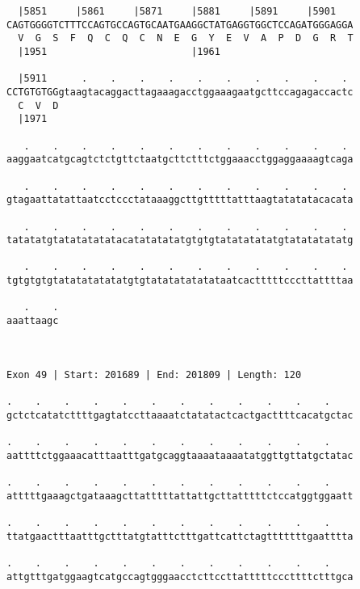 \documentclass{article}
\begin{document}
\begin{Verbatim}
  |5851     |5861     |5871     |5881     |5891     |5901   
CAGTGGGGTCTTTCCAGTGCCAGTGCAATGAAGGCTATGAGGTGGCTCCAGATGGGAGGA
  V  G  S  F  Q  C  Q  C  N  E  G  Y  E  V  A  P  D  G  R  T
  |1951                         |1961                       
  
  |5911      .    .    .    .    .    .    .    .    .    . 
CCTGTGTGGgtaagtacaggacttagaaagacctggaaagaatgcttccagagaccactc
  C  V  D                                                   
  |1971                                                     
  
   .    .    .    .    .    .    .    .    .    .    .    . 
aaggaatcatgcagtctctgttctaatgcttctttctggaaacctggaggaaaagtcaga
                                                            
   .    .    .    .    .    .    .    .    .    .    .    . 
gtagaattatattaatcctccctataaaggcttgtttttatttaagtatatatacacata
                                                            
   .    .    .    .    .    .    .    .    .    .    .    . 
tatatatgtatatatatatacatatatatatgtgtgtatatatatatgtatatatatatg
                                                            
   .    .    .    .    .    .    .    .    .    .    .    . 
tgtgtgtgtatatatatatatgtgtatatatatatataatcactttttcccttattttaa
                                                            
   .    .
aaattaagc
         
         
 
Exon 49 | Start: 201689 | End: 201809 | Length: 120
 
.    .    .    .    .    .    .    .    .    .    .    .    
gctctcatatcttttgagtatccttaaaatctatatactcactgacttttcacatgctac
                                                            
.    .    .    .    .    .    .    .    .    .    .    .    
aattttctggaaacatttaatttgatgcaggtaaaataaaatatggttgttatgctatac
                                                            
.    .    .    .    .    .    .    .    .    .    .    .    
atttttgaaagctgataaagcttatttttattattgcttatttttctccatggtggaatt
                                                            
.    .    .    .    .    .    .    .    .    .    .    .    
ttatgaactttaatttgctttatgtatttctttgattcattctagtttttttgaatttta
                                                            
.    .    .    .    .    .    .    .    .    .    .    .    
attgtttgatggaagtcatgccagtgggaacctcttccttatttttcccttttctttgca
                                                            

\end{Verbatim}
\end{document}
